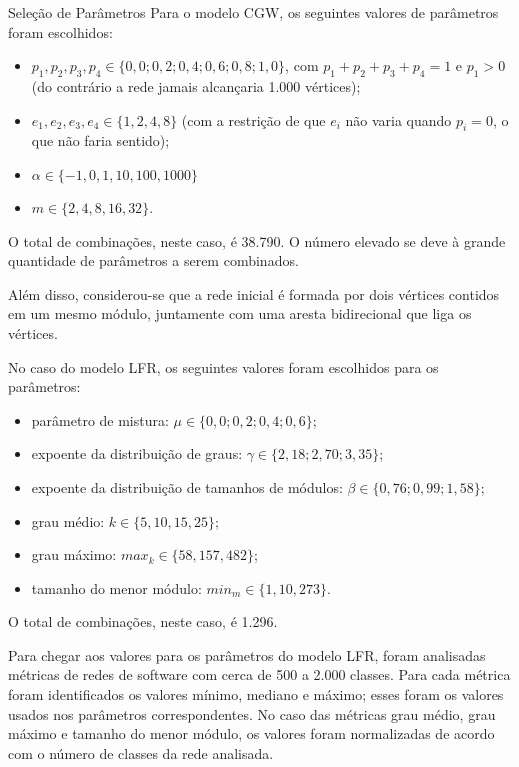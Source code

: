 \begin{section}{Seleção de Parâmetros}
Para o modelo CGW, os seguintes valores de parâmetros foram escolhidos:

\begin{itemize}
	\item $p_1, p_2, p_3, p_4 \in \{0,0; 0,2; 0,4; 0,6; 0,8; 1,0\}$, com $p_1 + p_2 + p_3 + p_4 = 1$ e $p_1 > 0$ (do contrário a rede jamais alcançaria 1.000 vértices);
	\item $e_1, e_2, e_3, e_4 \in \{1, 2, 4, 8\}$ (com a restrição de que $e_i$ não varia quando $p_i = 0$, o que não faria sentido);
	\item $\alpha \in \{-1, 0, 1, 10, 100, 1000\}$
	\item $m \in \{2, 4, 8, 16, 32\}$.
\end{itemize}

O total de combinações, neste caso, é 38.790. O número elevado se deve à grande quantidade de parâmetros a serem combinados.

Além disso, considerou-se que a rede inicial é formada por dois vértices contidos em um mesmo módulo, juntamente com uma aresta bidirecional que liga os vértices.

No caso do modelo LFR, os seguintes valores foram escolhidos para os parâmetros:

\begin{itemize}
	\item parâmetro de mistura: $\mu \in \{0,0; 0,2; 0,4; 0,6\}$;
	\item expoente da distribuição de graus: $\gamma \in \{2,18; 2,70; 3,35\}$;
	\item expoente da distribuição de tamanhos de módulos: $\beta \in \{0,76; 0,99; 1,58\}$;
	\item grau médio: $k \in \{5, 10, 15, 25\}$;
	\item grau máximo: $max_k \in \{58, 157, 482\}$;
	\item tamanho do menor módulo: $min_m \in \{1, 10, 273\}$.
\end{itemize}

O total de combinações, neste caso, é 1.296.

Para chegar aos valores para os parâmetros do modelo LFR, foram analisadas métricas de redes de software com cerca de 500 a 2.000 classes. Para cada métrica foram identificados os valores mínimo, mediano e máximo; esses foram os valores usados nos parâmetros correspondentes. No caso das métricas grau médio, grau máximo e tamanho do menor módulo, os valores foram normalizadas de acordo com o número de classes da rede analisada.


\end{section}


